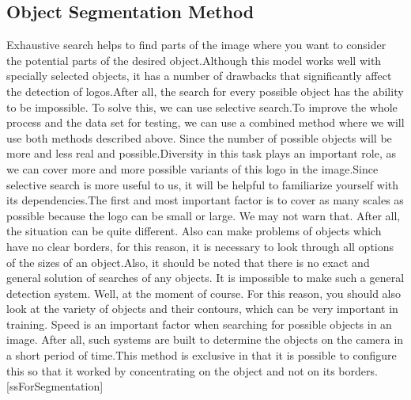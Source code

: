 \subsection{Object Segmentation Method}\label{sec:4.2.1}
\par Exhaustive search helps to find parts of the image where you want to consider the potential parts of the desired object.Although this model works well with specially selected objects, it has a number of drawbacks that significantly affect the detection of logos.After all, the search for every possible object has the ability to be impossible. To solve this, we can use selective search.To improve the whole process and the data set for testing, we can use a combined method where we will use both methods described above. Since the number of possible objects will be more and less real and possible.Diversity in this task plays an important role, as we can cover more and more possible variants of this logo in the image.Since selective search is more useful to us, it will be helpful to familiarize yourself with its dependencies.The first and most important factor is to cover as many scales as possible because the logo can be small or large. We may not warn that. After all, the situation can be quite different. Also can make problems of objects which have no clear borders, for this reason, it is necessary to look through all options of the sizes of an object.Also, it should be noted that there is no exact and general solution of searches of any objects. It is impossible to make such a general detection system. Well, at the moment of course. For this reason, you should also look at the variety of objects and their contours, which can be very important in training. Speed is an important factor when searching for possible objects in an image. After all, such systems are built to determine the objects on the camera in a short period of time.This method is exclusive in that it is possible to configure this so that it worked by concentrating on the object and not on its borders.[ssForSegmentation]


